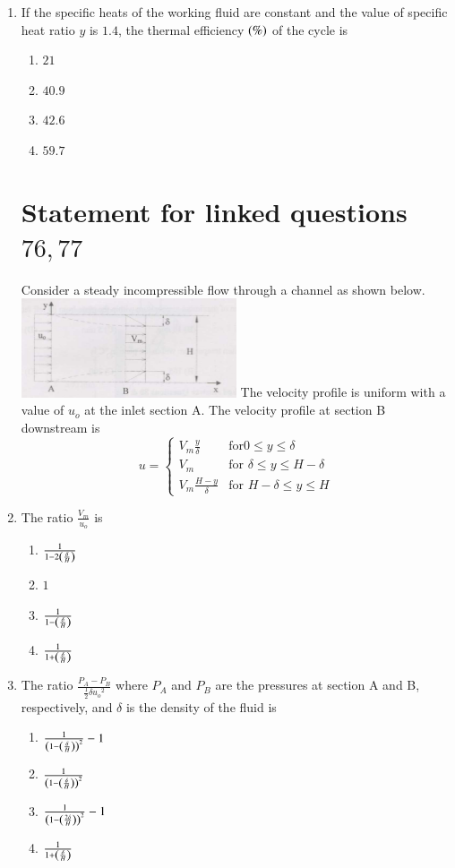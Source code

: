 \documentclass[journal,12pt,twocolumn]{IEEEtran}
\theoremstyle{remark}
\begin{document}
\begin{enumerate}[start=69]
\begin{enumerate}
\end{enumerate}
  \item If the specific heats of the working fluid are constant and the value of specific heat ratio $y$ is $1.4$, the thermal efficiency $\left(\%\right)$ of the cycle is
    \begin{enumerate}
        \item $21$
        \item $40.9$
        \item $42.6$
        \item $59.7$
    \end{enumerate} 
\section{Statement for linked questions $76,77 $}
Consider a steady incompressible flow through a channel as shown below.
\includegraphics[width=0.5\textwidth]{Screenshot 2024-10-23 173418.png}
The velocity profile is uniform with a value of $u_o$ at the inlet section A. The velocity profile at section B downstream is
$$
u = 
\begin{cases} 
V_m\frac{y}{\delta} & \text{for}  0 \leq y \leq \delta \\ 
V_m & \text{for } \delta \leq y \leq H-\delta \\ 
V_m\frac{H-y}{\delta} & \text{for } H-\delta \leq y \leq H 
\end{cases}
$$
    \item The ratio $\frac{V_m}{u_o}$ is
    \begin{enumerate}
        \item $\frac{1}{1 - 2\left(\frac{\delta}{H}\right)}$
        \item $1$
        \item $\frac{1}{1 - \left(\frac{\delta}{H}\right)}$
        \item $\frac{1}{1 + \left(\frac{\delta}{H}\right)}$
    \end{enumerate}
    
    \item The ratio $\frac{P_A - P_B}{\frac{1}{2}\delta{u_o}^2}$ where $P_A$ and $P_B$ are the pressures at section A and B, respectively, and $\delta$ is the density of the fluid is
    \begin{enumerate}
        \item $ \frac{1}{\left(1-\left(\frac{\delta}{H}\right)\right)^2} -1$
        \item $ \frac{1}{\left(1-\left(\frac{\delta}{H}\right)\right)^2}$
        \item $ \frac{1}{\left(1-\left(\frac{2\delta}{H}\right)\right)^2} -1$
        \item $ \frac{1}{1+\left(\frac{\delta}{H}\right)}$
    \end{enumerate}

\end{enumerate}
\end{document}
